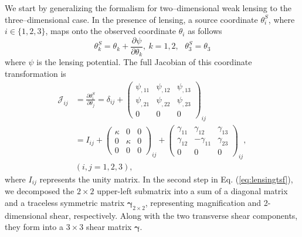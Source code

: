 We start by generalizing the formalism for two--dimensional weak lensing \cite{Weinberg201387} to the three--dimensional case.
In the presence of lensing, a source coordinate $\theta_i^S$, where $i\in\{1,2,3\}$, maps onto the observed coordinate $\theta_i$ as follows \begin{equation}
\theta_k^S=\theta_k+\frac{\partial\psi}{\partial\theta_k},\ k=1,2,\ \ \ \theta_3^S=\theta_3
\label{eq:lensingmapping}
\end{equation}
where $\psi$ is the lensing potential. The full Jacobian of this coordinate transformation is
\begin{align}
\mathcal{J}_{ij}&=\frac{\partial\theta_i^S}{\partial\theta_j}=\delta_{ij}+\left(\begin{array}{ccc}
\psi_{,11} & \psi_{,12} & \psi_{,13}\\
\psi_{,21} & \psi_{,22} & \psi_{,23}\\
0&0&0
\end{array}\right)_{ij} \nonumber\\
&= I_{ij} + \left(\begin{array}{ccc}
\kappa & 0 & 0\\
0 & \kappa & 0\\
0&0&0
\end{array}\right)_{ij}+\left(\begin{array}{ccc}
\gamma_{11} & \gamma_{12} & \gamma_{13}\\
\gamma_{12} & -\gamma_{11} & \gamma_{23}\\
0&0&0
\end{array}\right)_{ij},\nonumber\\
&(i,j=1,2,3),
\label{eq:lensingtsf}
\end{align}
where $I_{ij}$ represents the unity matrix. In the second step in Eq. (\ref{eq:lensingtsf}), we decomposed the $2\times 2$ upper-left submatrix into a sum of a diagonal matrix and a traceless symmetric matrix $\bm{\gamma}_{2\times 2}$, representing magnification and 2-dimensional shear, respectively. Along with the two transverse shear components, they form into a $3\times 3$ shear matrix $\bm{\gamma}$.

